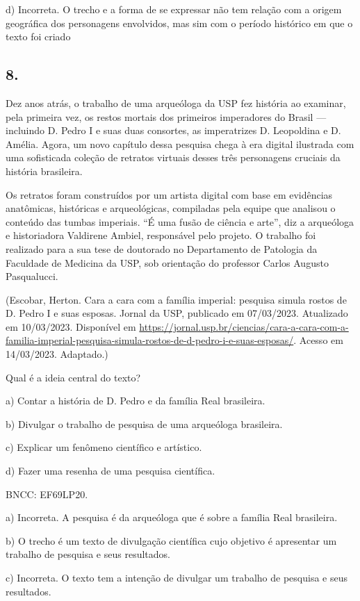d) Incorreta. O trecho e a forma de se expressar não tem relação com a
origem geográfica dos personagens envolvidos, mas sim com o período
histórico em que o texto foi criado


\subsection{8.}

Dez anos atrás, o trabalho de uma arqueóloga da USP fez história ao
examinar, pela primeira vez, os restos mortais dos primeiros imperadores
do Brasil --- incluindo D. Pedro I e suas duas consortes, as
imperatrizes D. Leopoldina e D. Amélia. Agora, um novo capítulo dessa
pesquisa chega à era digital ilustrada com uma sofisticada coleção de
retratos virtuais desses três personagens cruciais da história
brasileira.

Os retratos foram construídos por um artista digital com base em
evidências anatômicas, históricas e arqueológicas, compiladas pela
equipe que analisou o conteúdo das tumbas imperiais. ``É uma fusão de
ciência e arte'', diz a arqueóloga e historiadora Valdirene Ambiel,
responsável pelo projeto. O trabalho foi realizado para a sua tese de
doutorado no Departamento de Patologia da Faculdade de Medicina da USP,
sob orientação do professor Carlos Augusto Pasqualucci.

(Escobar, Herton. Cara a cara com a família imperial: pesquisa simula
rostos de D. Pedro I e suas esposas. Jornal da USP, publicado em
07/03/2023. Atualizado em 10/03/2023. Disponível em
\url{https://jornal.usp.br/ciencias/cara-a-cara-com-a-familia-imperial-pesquisa-simula-rostos-de-d-pedro-i-e-suas-esposas/}.
Acesso em 14/03/2023. Adaptado.)

Qual é a ideia central do texto?

a) Contar a história de D. Pedro e da família Real brasileira.

b) Divulgar o trabalho de pesquisa de uma arqueóloga brasileira.

c) Explicar um fenômeno científico e artístico.

d) Fazer uma resenha de uma pesquisa científica.

BNCC: EF69LP20.

a) Incorreta. A pesquisa é da arqueóloga que é sobre a família Real
brasileira.

b) O trecho é um texto de divulgação científica cujo objetivo é
apresentar um trabalho de pesquisa e seus resultados.

c) Incorreta. O texto tem a intenção de divulgar um trabalho de pesquisa
e seus resultados.

